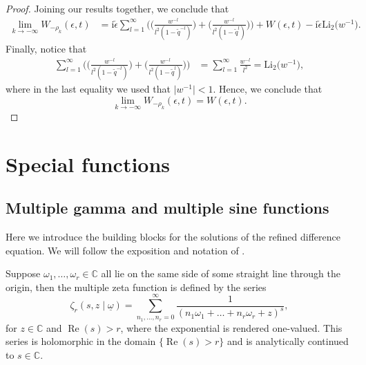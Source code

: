 \documentclass[pdftex]{sigma}
\numberwithin{equation}{section}
\begin{document}
\begin{proof}
Joining our results together, we conclude that
\begin{equation*}
 \begin{split}
 \lim_{k\to -\infty}W_{-\rho_k}(\epsilon,t)&=\mathrm{i}\check\epsilon\sum_{l=1}^{\infty}\bigg(\bigg(\frac{w^{-l}}{l^2(1-\widetilde{q}^{-l})}\bigg) + \bigg(\frac{w^{-l}}{l^2(1-\widetilde{q}^{l})}\bigg)\bigg)+W(\epsilon,t) -\mathrm{i}\check{\epsilon}\mathrm{Li}_2\big(w^{-1}\big).
 \end{split}
\end{equation*}
Finally, notice that
\begin{equation*}
 \begin{split}
 \sum_{l=1}^{\infty}\bigg(\bigg(\frac{w^{-l}}{l^2(1-\widetilde{q}^{-l})}\bigg) + \bigg(\frac{w^{-l}}{l^2(1-\widetilde{q}^{l})}\bigg)\bigg)&=\sum_{l=1}^{\infty}\frac{w^{-l}}{l^2}=\mathrm{Li}_2\big(w^{-1}\big),
 \end{split}
\end{equation*}
where in the last equality we used that $\big|w^{-1}\big|<1$. Hence, we conclude that
\begin{equation*}
 \lim_{k\to -\infty}W_{-\rho_k}(\epsilon,t)=W(\epsilon,t).\tag*{\qed}
\end{equation*}\renewcommand{\qed}{}
\end{proof}

\section{Special functions}\label{specialfunctapp}
\subsection{Multiple gamma and multiple sine functions}
Here we introduce the building blocks for the solutions of the refined difference equation. We will follow the exposition and notation of \cite{Narukawa}.

Suppose $\omega_1,\dots,\omega_r \in \mathbb{C}$ all lie on the same side of some straight line through the origin, then the multiple zeta function is defined by the series
\begin{equation*}
\zeta_r(s,z\mid\underline{\omega}) = \sum_{n_1,\dots,n_r=0}^{\infty} \frac{1}{(n_1\omega_1+\dots+ n_r \omega_r +z)^s},
\end{equation*}
for $z\in \mathbb{C}$ and $\operatorname{Re}(s) >r$, where the exponential is rendered one-valued. This series is holomorphic in the domain $\{ \operatorname{Re} (s)>r\}$ and is analytically continued to $s\in \mathbb{C}$.
\end{document}
